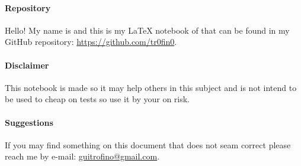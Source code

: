 \documentclass[class=article, crop=false]{standalone}
\begin{document}
\paragraph{Repository}Hello! My name is \@author\space and this is my LaTeX notebook of \@title\space that can be found in my GitHub repository: \url{https://github.com/tr0fin0}.

\paragraph{Disclaimer}This notebook is made so it may help others in this subject and is not intend to be used to cheap on tests so use it by your on risk.

\paragraph{Suggestions}If you may find something on this document that does not seam correct please reach me by e-mail: \url{guitrofino@gmail.com}.
\vspace{20mm}
\end{document}
